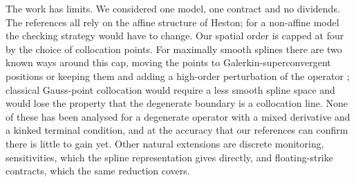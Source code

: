 The work has limits. We considered one model, one contract and no dividends. The references all rely on
the affine structure of Heston; for a non-affine model the checking strategy would have to change. Our
spatial order is capped at four by the choice of collocation points. For maximally smooth splines there
are two known ways around this cap, moving the points to Galerkin-superconvergent positions
\citep{Anitescu2015,Montardini2017} or keeping them and adding a high-order perturbation of the operator
\citep{IrodotouEllinaHoustis1988,ChristaraNg2006}; classical Gauss-point collocation
\citep{deBoorSwartz1973,BialeckiFairweather2001} would require a less smooth spline space and would lose
the property that the degenerate boundary is a collocation line. None of these has been analysed for a
degenerate operator with a mixed derivative and a kinked terminal condition, and at the accuracy that our
references can confirm there is little to gain yet. Other natural extensions are discrete monitoring,
sensitivities, which the spline representation gives directly, and floating-strike contracts, which the
same reduction covers.
